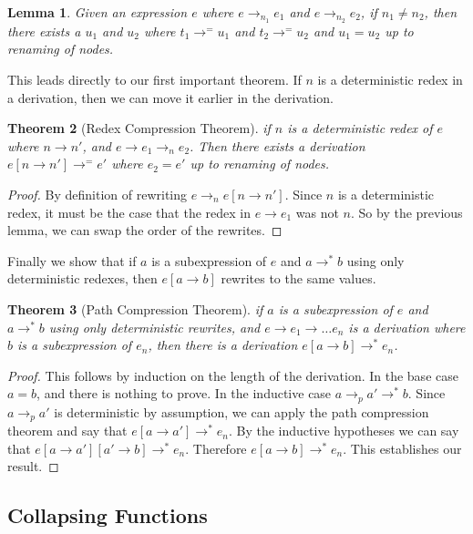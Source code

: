 \documentclass{book}
\newtheorem{theorem}{Theorem}
\newtheorem{lemma}[theorem]{Lemma}
\theoremstyle{definition}
\begin{document}
\begin{lemma}
Given an expression $e$ where $e \to_{n_1} e_1$ and $e \to_{n_2} e_2$,
if $n_1 \ne n_2$, then there exists a $u_1$ and $u_2$ where
$t_1 \to^= u_1$ and $t_2 \to^= u_2$ and $u_1 = u_2$ up to renaming of nodes.
\end{lemma}

This leads directly to our first important theorem.
If $n$ is a deterministic redex in a derivation, then we can move it earlier in the derivation.

\begin{theorem}[Redex Compression Theorem]
if $n$ is a deterministic redex of $e$ where $n \to n'$, and $e \to e_1 \to_n e_2$.
Then there exists a derivation $e[n \to n'] \to^= e'$ where $e_2 = e'$ up to renaming of nodes.
\end{theorem}

\begin{proof}
By definition of rewriting $e \to_n e[n\to n']$.
Since $n$ is a deterministic redex, it must be the case that the redex in $e \to e_1$
was not $n$. So by the previous lemma, we can swap the order of the rewrites.
\end{proof}

Finally we show that if $a$ is a subexpression of $e$ and $a \to^* b$ using only deterministic redexes,
then $e[a \to b]$ rewrites to the same values.

\begin{theorem}[Path Compression Theorem]
if $a$ is a subexpression of $e$ and $a \to^* b$ using only deterministic rewrites,
and $e \to e_1 \to \ldots e_n$ is a derivation where $b$ is a subexpression of $e_n$,
then there is a derivation $e[a\to b] \to^* e_n$.
\end{theorem}

\begin{proof}
This follows by induction on the length of the derivation.
In the base case $a = b$, and there is nothing to prove.
In the inductive case $a \to_p a' \to^* b$.
Since $a \to_p a'$ is deterministic by assumption,
we can apply the path compression theorem and say that $e[a \to a'] \to^* e_n$.
By the inductive hypotheses we can say that $e[a \to a'][a' \to b] \to^* e_n$.
Therefore $e[a \to b] \to^* e_n$.
This establishes our result.
\end{proof}



\subsection{Collapsing Functions} \label{Collapsing Functions}
\end{document}
